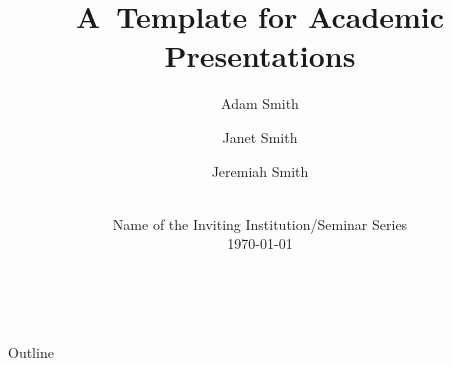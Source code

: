 

\newcommand{\balA}[1][1]{BAL$^\mathup{I}_{#1:#1}$\xspace}
\newcommand{\unbalA}[1][n]{UNBAL$^\mathup{I}_{1:#1}$\xspace}
\newcommand{\balB}[1][1]{BAL$^\mathup{II}_{#1:#1}$\xspace}
\newcommand{\unbalB}[1][n]{UNBAL$^\mathup{II}_{#1:1}$\xspace}



\title{A~Template for Academic Presentations}


\author[Smith, Smith, and Smith]{%
	Adam Smith \and
	\alert{Janet Smith} \and
	Jeremiah Smith
} %


\date{%
	\\
	Name of the Inviting Institution/Seminar Series \\[\medskipamount]
	\textmd{\today}%
}






\begin{frame}[standout]{~}

	\titlepage%

\end{frame}


\begin{frame}[standout]{Outline}

	\medskip
	\tableofcontents

\end{frame}




